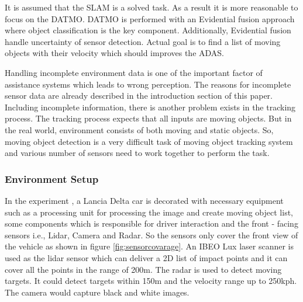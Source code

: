 It is assumed that the SLAM is a solved task. As a result it is more reasonable to focus on the DATMO\cite{Chavez_Garcia_2016}. DATMO is performed with an Evidential fusion approach where object classification is the key component. Additionally, Evidential fusion handle uncertainty of sensor detection. Actual goal is to find a list of moving objects with their velocity which should improves the ADAS.

Handling incomplete environment data is one of the important factor of assistance systems which leads to wrong perception. The reasons for incomplete sensor data are already described in the introduction section of this paper. Including incomplete information, there is another problem exists in the tracking process. The tracking process expects that all inputs are moving objects. But in the real world, environment consists of both moving and static objects. So, moving object detection is a very difficult task of moving object tracking system and various number of sensors need to work together to perform the task.

\subsubsection{Environment Setup}
In the experiment \cite{Chavez_Garcia_2016}, a Lancia Delta car is decorated with necessary equipment such as a processing unit for processing the image and create moving object list, some components which is responsible for driver interaction and the front - facing sensors i.e., Lidar, Camera and Radar. So the sensors only cover the front view of the vehicle as shown in figure \ref{fig:sensorcovarage}. An IBEO Lux laser scanner is used as the lidar sensor which can deliver a 2D list of impact points and it can cover all the points in the range of 200m. The radar is used to detect moving targets. It could detect targets within 150m and the velocity range up to 250kph. The camera would capture black and white images.

